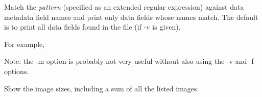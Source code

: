 Match the \emph{pattern} (specified as an extended regular expression)
against data metadata field names and print only data fields whose names
match.  The default is to print all data fields found in the file (if
{\cf -v} is given).

For example,
\apiend

Note: the {\cf -m} option is probably not very useful without also using
the {\cf -v} and {\cf -f} options.

Show the image sizes, including a sum of all the listed images.
\apiend

